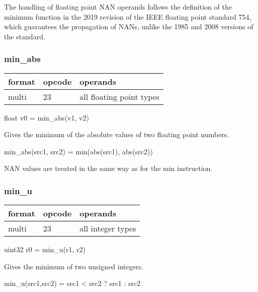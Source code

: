 \documentclass[forwardcom.tex]{subfiles}
\begin{document}
The handling of floating point NAN operands follows the definition of the minimum function in the 2019 revision of the IEEE floating point standard 754, which guarantees the propagation of NANs, unlike the 1985 and 2008 versions of the standard.
\vspace{2mm}

\subsubsection{min\_abs}
\label{table:minAbsInstruction}
\begin{tabular}{|p{12mm}|p{12mm}|p{110mm}|}
\hline
\bfseries format & \bfseries opcode & \bfseries operands \\ \hline
multi & 23 & all floating point types \\ \hline
\end{tabular}
\vspace{2mm}

float v0 = min\_abs(v1, v2)
\vspace{2mm}

Gives the minimum of the absolute values of two floating point numbers.
\vspace{2mm}

min\_abs(src1, src2) = min(abs(src1), abs(src2))
\vspace{2mm}

NAN values are treated in the same way as for the min instruction.

\subsubsection{min\_u}
\label{table:minUInstruction}
\begin{tabular}{|p{12mm}|p{12mm}|p{110mm}|}
\hline
\bfseries format & \bfseries opcode & \bfseries operands \\ \hline
multi & 23 & all integer types \\ \hline
\end{tabular}
\vspace{2mm}

uint32 r0 = min\_u(r1, r2)
\vspace{2mm}

Gives the minimum of two unsigned integers.
\vspace{2mm}

min\_u(src1,src2) = src1 \textless{} src2 ? src1 : src2
\end{document}

